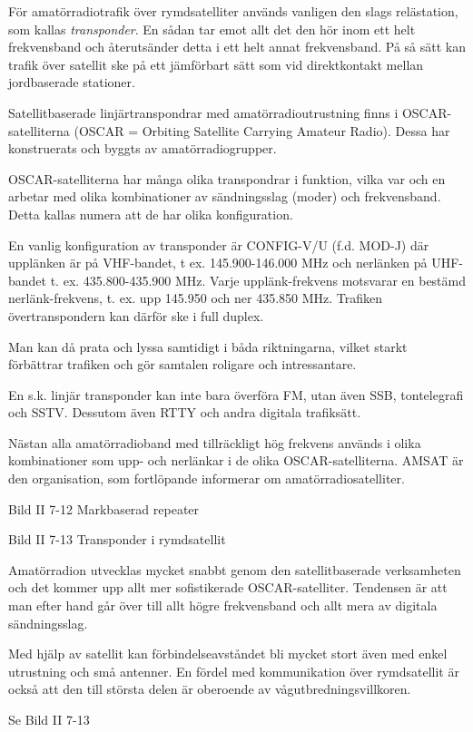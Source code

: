 För amatörradiotrafik över rymdsatelliter används vanligen den slags
relästation, som kallas \emph{transponder}. En sådan tar emot allt det
den hör inom ett helt frekvensband och återutsänder detta i ett helt
annat frekvensband. På så sätt kan trafik över satellit ske på ett
jämförbart sätt som vid direktkontakt mellan jordbaserade stationer.

Satellitbaserade linjärtranspondrar med amatörradioutrustning finns i
OSCAR-satelliterna (OSCAR = Orbiting Satellite Carrying Amateur
Radio). Dessa har konstruerats och byggts av amatörradiogrupper.

OSCAR-satelliterna har många olika transpondrar i funktion, vilka var
och en arbetar med olika kombinationer av sändningsslag (moder) och
frekvensband. Detta kallas numera att de har olika konfiguration.

En vanlig konfiguration av transponder är CONFIG-V/U (f.d. MOD-J) där
upplänken är på VHF-bandet, t ex. 145.900-146.000 MHz och nerlänken på
UHF-bandet t. ex.  435.800-435.900 MHz. Varje upplänk-frekvens
motsvarar en bestämd nerlänk-frekvens, t. ex. upp 145.950 och ner
435.850 MHz. Trafiken övertranspondern kan därför ske i full duplex.

Man kan då prata och lyssa samtidigt i båda riktningarna, vilket
starkt förbättrar trafiken och gör samtalen roligare och
intressantare.

En s.k. linjär transponder kan inte bara överföra FM, utan även SSB,
tontelegrafi och SSTV. Dessutom även RTTY och andra digitala
trafiksätt.

Nästan alla amatörradioband med tillräckligt hög frekvens används i
olika kombinationer som upp- och nerlänkar i de olika
OSCAR-satelliterna.  AMSAT är den organisation, som fortlöpande
informerar om amatörradiosatelliter.

Bild II 7-12 Markbaserad repeater

Bild II 7-13 Transponder i rymdsatellit

Amatörradion utvecklas mycket snabbt genom den satellitbaserade
verksamheten och det kommer upp allt mer sofistikerade
OSCAR-satelliter. Tendensen är att man efter hand går över till allt
högre frekvensband och allt mera av digitala sändningsslag.

Med hjälp av satellit kan förbindelseavståndet bli mycket stort även
med enkel utrustning och små antenner. En fördel med kommunikation
över rymdsatellit är också att den till största delen är oberoende av
vågutbredningsvillkoren.

Se Bild II 7-13
